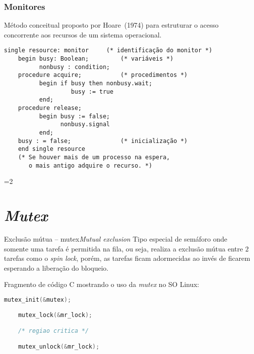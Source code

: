 \begin{frame}[fragile]
  \frametitle{Monitores}

  Método conceitual proposto por Hoare~(1974) para estruturar o acesso
  concorrente aos recursos de um sistema operacional.\bigskip

  \centering
  \begin{lstlisting}[morekeywords={begin,end,%
      monitor,procedure},frame=single]
    single resource: monitor     (* identificação do monitor *)
    begin busy: Boolean;         (* variáveis *)
          nonbusy : condition;
    procedure acquire;           (* procedimentos *)
          begin if busy then nonbusy.wait;
                   busy := true
          end;
    procedure release;
          begin busy := false;
                nonbusy.signal
          end;
    busy : = false;              (* inicialização *)
    end single resource
    (* Se houver mais de um processo na espera,
       o mais antigo adquire o recurso. *)
  \end{lstlisting}
\end{frame}


=2


\section{\insertlecture}

\def\thetitle{\em Mutex}
\section{\thetitle}

\begin{frame}[fragile]{Exclusão mútua -- mutex}{\em Mutual exclusion}
  \small
  Tipo especial de semáforo onde somente uma tarefa é permitida na
  fila, ou seja, realiza a exclusão mútua entre $2$ tarefas como o
  \alert{\em spin lock}, porém, as tarefas ficam \alert{adormecidas} ao invés de
  ficarem esperando a liberação do bloqueio.\\
\bigskip

Fragmento de código C mostrando o uso da \alert{\em mutex} no SO Linux:

  \begin{lstlisting}[language=c,frame=single]
    mutex_init(&mutex);

    mutex_lock(&mr_lock);

    /* regiao critica */

    mutex_unlock(&mr_lock);
  \end{lstlisting}

\end{frame}

